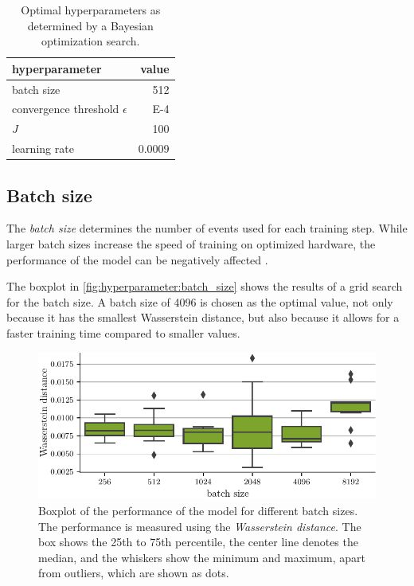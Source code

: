 \begin{table}
    \centering
    \caption{
      Optimal hyperparameters as determined by a Bayesian optimization search.
    }
    \label{tab:hyperparameters:initial}
    \begin{tabular}{l r}
        \toprule
        hyperparameter & {value} \\
        \midrule
        batch size & \num{512} \\
        convergence threshold $\epsilon$ & \num{E-4} \\
        $J$ & \num{100} \\ %
        learning rate & \num{0.0009} \\
        \bottomrule
    \end{tabular}
\end{table}


\FloatBarrier
\subsection{Batch size}
The \emph{batch size} determines the number of events used for each training step.
While larger batch sizes increase the speed of training
on optimized hardware,
the performance of the model can be negatively affected \cite{batchsize_kandel}.

The boxplot in \autoref{fig:hyperparameter:batch_size} shows the results of a grid search for the batch size.
A batch size of \num{4096} is chosen as the optimal value,
not only because it has the smallest Wasserstein distance,
but also because it allows for a faster training time
  compared to smaller values.

\begin{figure}
  \centering
  \includegraphics[scale=1]{content/plots/hyperparam/batch_size_vs_wd_boxplot_lessheight.pdf}
  \caption{Boxplot of the performance of the model for different batch sizes.
    The performance is measured using the \emph{Wasserstein distance}.
    The box shows the 25th to 75th percentile,
    the center line denotes the median,
    and the whiskers show the minimum and maximum,
      apart from outliers,
        which are shown as dots.
  }
  \label{fig:hyperparameter:batch_size}
\end{figure}


